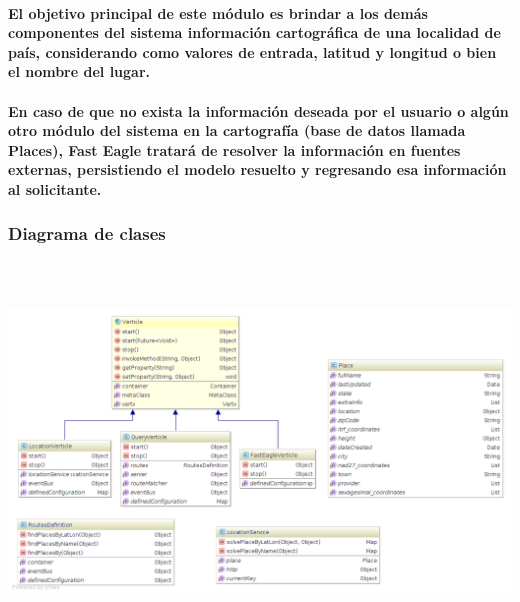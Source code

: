       \paragraph{El objetivo principal de este módulo es brindar a los demás componentes del sistema información cartográfica de una localidad de país, considerando como valores de entrada, latitud y longitud o bien el nombre del lugar.}
      \paragraph{En caso de que no exista la información deseada por el usuario o algún otro módulo del sistema en la cartografía (base de datos llamada Places), Fast Eagle tratará de resolver la información en fuentes externas, persistiendo el modelo resuelto y regresando esa información al solicitante.}
    \subsubsection{Diagrama de clases}
    \begin{center}
      \includegraphics[width=16cm,height=10cm]{./images/FastEagleClassDiagram.png}
    \end{center}
    \newpage
